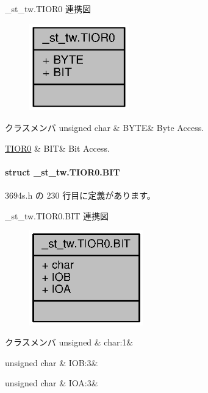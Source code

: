 \+\_\+st\+\_\+tw.\+T\+I\+O\+R0 連携図
\nopagebreak
\begin{figure}[H]
\begin{center}
\leavevmode
\includegraphics[width=122pt]{d0/dd3/union__st__tw_8TIOR0__coll__graph}
\end{center}
\end{figure}
\begin{DoxyFields}{クラスメンバ}
unsigned char\label{3694s_8h_ae409eb2ba6eb6801f52763ae370c350e}
&
B\+Y\+T\+E&
Byte Access. \\
\hline

\hyperlink{3694s_8h_dd/d1f/struct__st__tw_8TIOR0_8BIT}{T\+I\+O\+R0}\label{3694s_8h_adb957fdc8000e1eef04a243f5199aa52}
&
B\+I\+T&
Bit Access. \\
\hline

\end{DoxyFields}
\label{struct__st__tw_8TIOR0_8BIT}
\paragraph{struct \+\_\+st\+\_\+tw.\+T\+I\+O\+R0.\+B\+I\+T}


 3694s.\+h の 230 行目に定義があります。



\+\_\+st\+\_\+tw.\+T\+I\+O\+R0.\+B\+I\+T 連携図
\nopagebreak
\begin{figure}[H]
\begin{center}
\leavevmode
\includegraphics[width=140pt]{d4/dbd/struct__st__tw_8TIOR0_8BIT__coll__graph}
\end{center}
\end{figure}
\begin{DoxyFields}{クラスメンバ}
unsigned\label{3694s_8h_aa87deb01c5f539e6bda34829c8ef2368}
&
char\+:1&
\\
\hline

unsigned char\label{3694s_8h_ac753e1b7fe58e7c61f1eea4c3d32dbcf}
&
I\+O\+B\+:3&
\\
\hline

unsigned char\label{3694s_8h_a5453a88cafac69f0de5bdb58c7d02347}
&
I\+O\+A\+:3&
\\
\hline

\end{DoxyFields}
\label{union__st__tw_8TIOR1}

